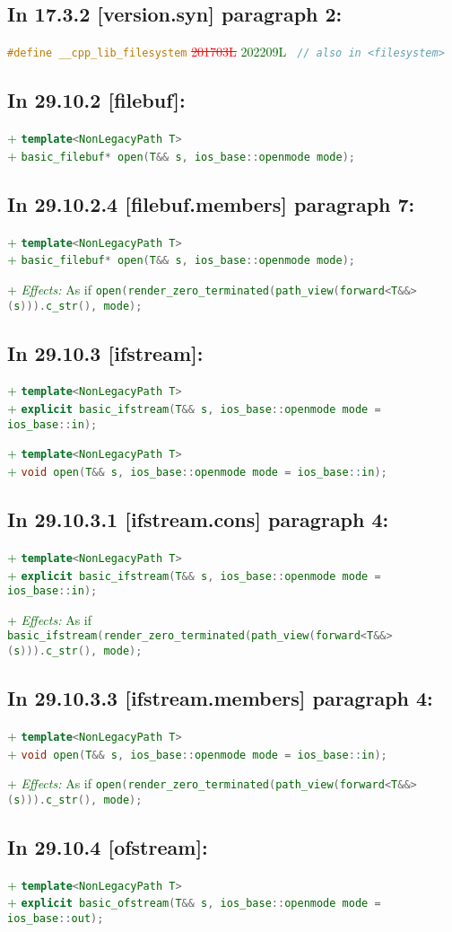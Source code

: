 \documentclass[11pt]{article}
\newcommand{\code}[2][cpp]{\lstinline[language=#1,basicstyle=\small\ttfamily]{#2}}
\newcommand{\desc}[1]{\textit{#1}}
\newcommand{\effects}{\desc{Effects: }}
\newcommand{\tsrefp}[3]{\subsection*{In #2 \textbf{[#1]} paragraph #3:}}
\newcommand{\tsref}[2]{\subsection*{In #2 \textbf{[#1]}:}}
\newcommand{\tsreplace}[3]{\textcolor{red}{\sout{#1}}#2\textcolor{darkgreen}{#3}}
\begin{document}
\tsrefp{version.syn}{17.3.2}{2}

\code{#define __cpp_lib_filesystem}
\tsreplace{201703L}{ }{202209L}
\code{ // also in <filesystem>}

\tsref{filebuf}{29.10.2}

\tsreplace{}{}{+ \code{template<NonLegacyPath T>}}\\
\tsreplace{}{}{+ \code{basic_filebuf* open(T&& s, ios_base::openmode mode);}}

\tsrefp{filebuf.members}{29.10.2.4}{7}

\tsreplace{}{}{+ \code{template<NonLegacyPath T>}}\\
\tsreplace{}{}{+ \code{basic_filebuf* open(T&& s, ios_base::openmode mode);}}

\tsreplace{}{}{+ \effects As if \code{open(render_zero_terminated(path_view(forward<T&&>(s))).c_str(), mode);}}

\tsref{ifstream}{29.10.3}

\tsreplace{}{}{+ \code{template<NonLegacyPath T>}}\\
\tsreplace{}{}{+ \code{explicit basic_ifstream(T&& s,
ios_base::openmode mode = ios_base::in);}}

\tsreplace{}{}{+ \code{template<NonLegacyPath T>}}\\
\tsreplace{}{}{+ \code{void open(T&& s, ios_base::openmode mode = ios_base::in);}}

\tsrefp{ifstream.cons}{29.10.3.1}{4}

\tsreplace{}{}{+ \code{template<NonLegacyPath T>}}\\
\tsreplace{}{}{+ \code{explicit basic_ifstream(T&& s,
ios_base::openmode mode = ios_base::in);}}

\tsreplace{}{}{+ \effects As if \code{basic_ifstream(render_zero_terminated(path_view(forward<T&&>(s))).c_str(), mode);}}

\tsrefp{ifstream.members}{29.10.3.3}{4}

\tsreplace{}{}{+ \code{template<NonLegacyPath T>}}\\
\tsreplace{}{}{+ \code{void open(T&& s, ios_base::openmode mode = ios_base::in);}}

\tsreplace{}{}{+ \effects As if \code{open(render_zero_terminated(path_view(forward<T&&>(s))).c_str(), mode);}}


\tsref{ofstream}{29.10.4}

\tsreplace{}{}{+ \code{template<NonLegacyPath T>}}\\
\tsreplace{}{}{+ \code{explicit basic_ofstream(T&& s,
ios_base::openmode mode = ios_base::out);}}
\end{document}

